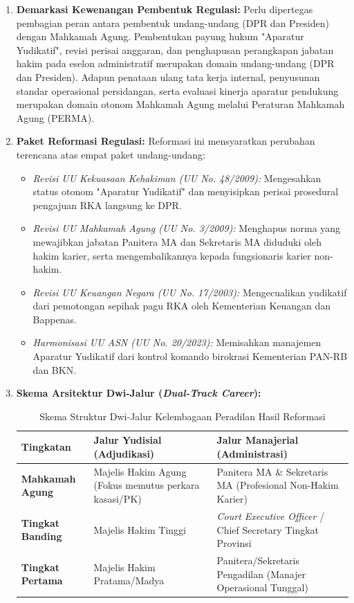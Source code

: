 \documentclass[12pt, a4paper]{article}
\begin{document}
\begin{enumerate}
    \item \textbf{Demarkasi Kewenangan Pembentuk Regulasi:} Perlu dipertegas pembagian peran antara pembentuk undang-undang (DPR dan Presiden) dengan Mahkamah Agung. Pembentukan payung hukum "Aparatur Yudikatif", revisi perisai anggaran, dan penghapusan perangkapan jabatan hakim pada eselon administratif merupakan domain undang-undang (DPR dan Presiden). Adapun penataan ulang tata kerja internal, penyusunan standar operasional persidangan, serta evaluasi kinerja aparatur pendukung merupakan domain otonom Mahkamah Agung melalui Peraturan Mahkamah Agung (PERMA).
    
    \item \textbf{Paket Reformasi Regulasi:} Reformasi ini mensyaratkan perubahan terencana atas empat paket undang-undang:
    \begin{itemize}
        \item \textit{Revisi UU Kekuasaan Kehakiman (UU No. 48/2009):} Mengesahkan status otonom "Aparatur Yudikatif" dan menyisipkan perisai prosedural pengajuan RKA langsung ke DPR.
        \item \textit{Revisi UU Mahkamah Agung (UU No. 3/2009):} Menghapus norma yang mewajibkan jabatan Panitera MA dan Sekretaris MA diduduki oleh hakim karier, serta mengembalikannya kepada fungsionaris karier non-hakim.
        \item \textit{Revisi UU Keuangan Negara (UU No. 17/2003):} Mengecualikan yudikatif dari pemotongan sepihak pagu RKA oleh Kementerian Keuangan dan Bappenas.
        \item \textit{Harmonisasi UU ASN (UU No. 20/2023):} Memisahkan manajemen Aparatur Yudikatif dari kontrol komando birokrasi Kementerian PAN-RB dan BKN.
    \end{itemize}

    \item \textbf{Skema Arsitektur Dwi-Jalur (\textit{Dual-Track Career}):}
    \begin{table}[H]
    \centering
    \fontsize{9}{11}\selectfont
    \caption{Skema Struktur Dwi-Jalur Kelembagaan Peradilan Hasil Reformasi}
    \label{tab:blueprint-bifurkasi}
    \renewcommand{\arraystretch}{1.3}
    \begin{tabular}{p{3.5cm} p{5.0cm} p{5.5cm}}
    \hline
    \textbf{Tingkatan} & \textbf{Jalur Yudisial (Adjudikasi)} & \textbf{Jalur Manajerial (Administrasi)} \\
    \hline
    \raggedright\textbf{Mahkamah Agung} & Majelis Hakim Agung (Fokus memutus perkara kasasi/PK) & Panitera MA \& Sekretaris MA (Profesional Non-Hakim Karier) \\
    \raggedright\textbf{Tingkat Banding} & Majelis Hakim Tinggi & \textit{Court Executive Officer} / Chief Secretary Tingkat Provinsi \\
    \raggedright\textbf{Tingkat Pertama} & Majelis Hakim Pratama/Madya & Panitera/Sekretaris Pengadilan (Manajer Operasional Tunggal) \\
    \hline
    \end{tabular}
    \end{table}


\end{enumerate}
\end{document}
